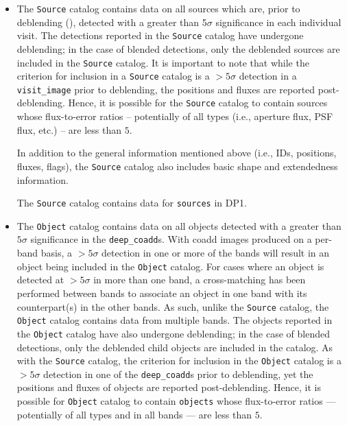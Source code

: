 \begin{itemize}
\item The \texttt{Source} catalog \citep{10.71929/rubin/2570323} contains data on all sources which are, prior to deblending (), detected with a greater than 5$\sigma$ significance in each individual visit.
The detections reported in the \texttt{Source} catalog have undergone deblending; in the case of blended detections, only the deblended sources are included in the \texttt{Source} catalog.
It is important to note that while the criterion for inclusion in a \texttt{Source} catalog is a $>5\sigma$ detection in a \texttt{visit\_image} prior to deblending, the positions and fluxes are reported post-deblending. 
Hence, it is possible for the \texttt{Source} catalog to contain sources whose \gls{flux}-to-error ratios -- potentially of all types (i.e., aperture \gls{flux}, \gls{PSF} \gls{flux}, etc.) -- are less than $5$.

In addition to the general information mentioned above (i.e., IDs, positions, fluxes, flags), the \texttt{Source} catalog also includes basic \gls{shape} and extendedness information.

The \texttt{Source} catalog contains data for \nsources \texttt{sources} in \gls{DP1}.

\item The \texttt{Object} catalog \citep{10.71929/rubin/2570325} contains data on all objects detected with a greater than $5\sigma$ significance in the \texttt{deep\_coadd}s.
With coadd images produced on a per-band basis, a $>5\sigma$ detection in one or more of the bands will result in an object being included in the \texttt{Object} catalog.
For cases where an object is detected at $>5\sigma$ in more than one band, a cross-matching has been performed between bands to associate an object in one band with its counterpart(s) in the other bands.
As such, unlike the \texttt{Source} catalog, the \texttt{Object} catalog contains data from multiple bands. 
The objects reported in the \texttt{Object} catalog have also undergone deblending; in the case of blended detections, only the deblended child objects are included in the catalog.
As with the \texttt{Source} catalog, the criterion for inclusion in the \texttt{Object} catalog is a $>5\sigma$ detection in one of the \texttt{deep\_coadd}s prior to deblending, yet the positions and fluxes of objects are reported post-deblending. 
Hence, it is possible for \texttt{Object} catalog to contain \texttt{objects} whose \gls{flux}-to-error ratios --- potentially of all types and in all bands --- are less than $5$.


\end{itemize}
